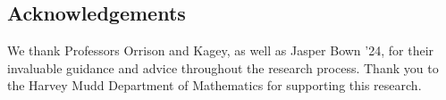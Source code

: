 \documentclass[thesis]{hmcposter}
\begin{document}
\begin{poster}


\vfill

\section{Acknowledgements}

We thank Professors Orrison and Kagey, as well as Jasper Bown '24, for their invaluable guidance and advice throughout the research process. Thank you to the Harvey Mudd Department of Mathematics for supporting this research.

\vfill
\end{poster}
\end{document}
